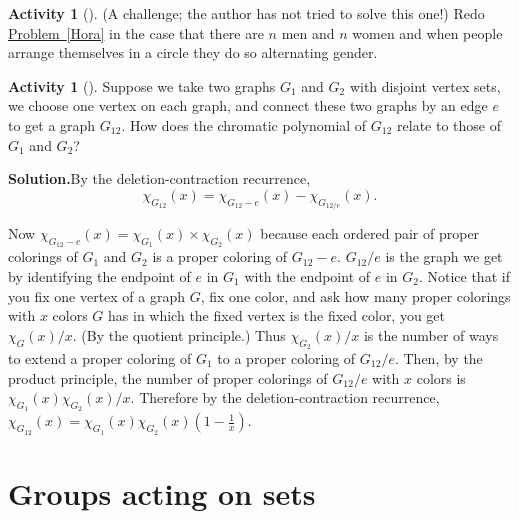 \documentclass[10pt,]{book}
\theoremstyle{plain}
\theoremstyle{definition}
\newtheorem{activity}[project]{Activity}
\numberwithin{equation}{chapter}
\begin{document}
\begin{activity}[]\label{activity-232}
(A challenge; the author has not tried to solve this one!) Redo \hyperref[Hora]{Problem~\ref{Hora}} in the case that there are \(n\) men and \(n\) women and when people arrange themselves in a circle they do so alternating gender.%
\end{activity}
\begin{activity}[]\label{activity-233}
Suppose we take two graphs \(G_1\) and \(G_2\) with disjoint vertex sets, we choose one vertex on each graph, and connect these two graphs by an edge \(e\) to get a graph \(G_{12}\). How does the chromatic polynomial of \(G_{12}\) relate to those of \(G_1\) and \(G_2\)?%
\par\medskip\noindent%
\textbf{Solution.}\quad By the deletion-contraction recurrence,%
\begin{equation*}
\chi_{G_{12}}(x) =
\chi_{G_{12}-e}(x)-\chi_{G_{12/e}}(x).
\end{equation*}
%
\par
Now \(\chi_{G_{12}-e}(x)=\chi_{G_1}(x)\times \chi_{G_2}(x)\) because each ordered pair of proper colorings of \(G_1\) and \(G_2\) is a proper coloring of \(G_{12}-e\). \(G_{12}/e\) is the graph we get by identifying the endpoint of \(e\) in \(G_1\) with the endpoint of \(e\) in \(G_2\). Notice that if you fix one vertex of a graph \(G\), fix one color, and ask how many proper colorings with \(x\) colors \(G\) has in which the fixed vertex is the fixed color, you get \(\chi_G(x)/x\).  (By the quotient principle.) Thus \(\chi_{G_2}(x)/x\) is the number of ways to extend a proper coloring of \(G_1\) to a proper coloring of \(G_{12}/e\). Then, by the product principle, the number of proper colorings of \(G_{12}/e\) with \(x\) colors is \(\chi_{G_1}(x)\chi_{G_2}(x)/x\). Therefore by the deletion-contraction recurrence, \(\chi_{G_{12}}(x) = \chi_{G_1}(x)\chi_{G_2}(x)(1-\frac{1}{x})\).%
\end{activity}
\typeout{************************************************}
\typeout{************************************************}
\chapter[{Groups acting on sets}]{Groups acting on sets}\label{groupsonsets}
\typeout{************************************************}
\typeout{************************************************}
\end{document}
